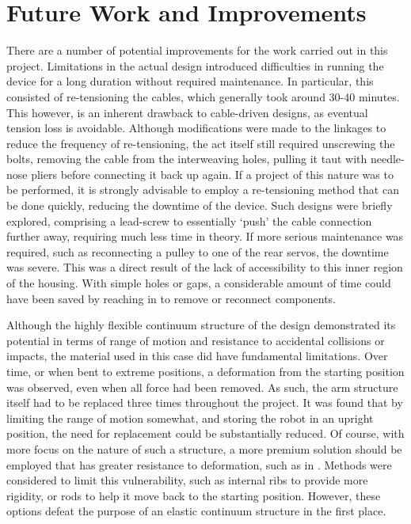 \documentclass[11pt]{article}
\begin{document}
 

\pagebreak
\section{Future Work and Improvements}
There are a number of potential improvements for the work carried out in this project. Limitations in the actual design introduced difficulties in running the device for a long duration without required maintenance. In particular, this consisted of re-tensioning the cables, which generally took around 30-40 minutes. This however, is an inherent drawback to cable-driven designs, as eventual tension loss is avoidable. Although modifications were made to the linkages to reduce the frequency of re-tensioning, the act itself still required unscrewing the bolts, removing the cable from the interweaving holes, pulling it taut with needle-nose pliers before connecting it back up again. If a project of this nature was to be performed, it is strongly advisable to employ a re-tensioning method that can be done quickly, reducing the downtime of the device. Such designs were briefly explored, comprising a lead-screw to essentially `push' the cable connection further away, requiring much less time in theory. If more serious maintenance was required, such as reconnecting a pulley to one of the rear servos, the downtime was severe. This was a direct result of the lack of accessibility to this inner region of the housing. With simple holes or gaps, a considerable amount of time could have been saved by reaching in to remove or reconnect components. 

Although the highly flexible continuum structure of the design demonstrated its potential in terms of range of motion and resistance to accidental collisions or impacts, the material used in this case did have fundamental limitations. Over time, or when bent to extreme positions, a deformation from the starting position was observed, even when all force had been removed. As such, the arm structure itself had to be replaced three times throughout the project. It was found that by limiting the range of motion somewhat, and storing the robot in an upright position, the need for replacement could be substantially reduced. Of course, with more focus on the nature of such a structure, a more premium solution should be employed that has greater resistance to deformation, such as in \cite{reinecke2016}. Methods were considered to limit this vulnerability, such as internal ribs to provide more rigidity, or rods to help it move back to the starting position. However, these options defeat the purpose of an elastic continuum structure in the first place. 
\end{document}
